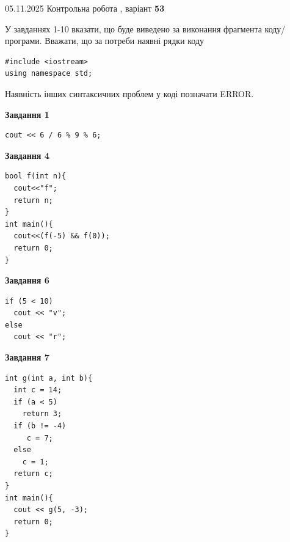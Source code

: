 \documentclass[12pt, ukrainian]{article}
\begin{document}
\newpage

{\Large{05.11.2025 Контрольна робота , варіант  \No \textbf { 53 }\par}}
{
\begin {large}
У завданнях 1-10 вказати, що буде виведено за виконання фрагмента коду/про\-гра\-ми.
Вважати, що за потреби наявні рядки коду
\begin{verbatim}
#include <iostream>
using namespace std;
\end{verbatim}
Наявність інших синтаксичних проблем у коді позначати ERROR.

\begin{minipage}[t]{7.0cm}

\begin{center}
\textbf{Завдання 1}
\end{center}
\vspace{-8mm}

\begin{verbatim}
cout << 6 / 6 % 9 % 6;
\end{verbatim}



\begin{center}
\textbf{Завдання 4}
\end{center}
\vspace{-8mm}

\begin{verbatim}
bool f(int n){
  cout<<"f";
  return n;
}
int main(){
  cout<<(f(-5) && f(0));
  return 0;
}
\end{verbatim}



\begin{center}
\textbf{Завдання 6}
\end{center}
\vspace{-8mm}

\begin{verbatim}
if (5 < 10)
  cout << "v";
else
  cout << "r";
\end{verbatim}



\begin{center}
\textbf{Завдання 7}
\end{center}
\vspace{-8mm}

\begin{verbatim}
int g(int a, int b){
  int c = 14;
  if (a < 5)
    return 3;
  if (b != -4)
     c = 7;
  else
    c = 1;
  return c;
}
int main(){
  cout << g(5, -3);
  return 0;
}
\end{verbatim}


\end{minipage}
\end{large}}
\end{document}
